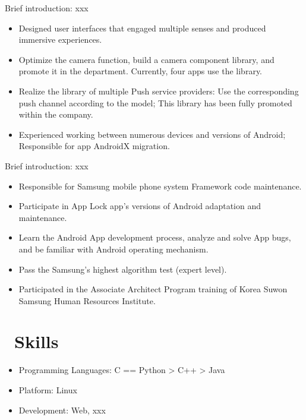 \documentclass{resume}
\begin{document}
Brief introduction: xxx
\begin{itemize}
  \item Designed user interfaces that engaged multiple senses and produced immersive experiences.
  \item Optimize the camera function, build a camera component library, and promote it in the department. Currently, four apps use the library.
  \item Realize the library of multiple Push service providers: Use the corresponding push channel according to the model; This library has been fully promoted within the company.
  \item Experienced working between numerous devices and versions of Android; Responsible for app AndroidX migration.
\end{itemize}

Brief introduction: xxx
\begin{itemize}
  \item Responsible for Samsung mobile phone system Framework code maintenance.
  \item Participate in App Lock app's versions of Android adaptation and maintenance.
  \item Learn the Android App development process, analyze and solve App bugs, and be familiar with Android operating mechanism.
  \item Pass the Samsung's highest algorithm test (expert level).
  \item Participated in the Associate Architect Program training of Korea Suwon Samsung Human Resources Institute.
\end{itemize}


\section{\faCogs\ Skills}
\begin{itemize}[parsep=0.5ex]
  \item Programming Languages: C == Python > C++ > Java
  \item Platform: Linux
  \item Development: Web, xxx
\end{itemize}
\end{document}
